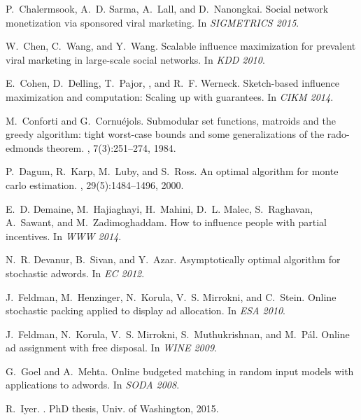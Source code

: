 \begin{thebibliography}{10}
\begin{scriptsize}
P.~Chalermsook, A.~D. Sarma, A.~Lall, and D.~Nanongkai.
\newblock Social network monetization via sponsored viral marketing.
\newblock In {\em SIGMETRICS 2015}.

W.~Chen, C.~Wang, and Y.~Wang.
\newblock Scalable influence maximization for prevalent viral marketing in
  large-scale social networks.
\newblock In {\em KDD 2010}.

E.~Cohen, D.~Delling, T.~Pajor, , and R.~F. Werneck.
\newblock Sketch-based influence maximization and computation: Scaling up with
  guarantees.
\newblock In {\em CIKM 2014}.

M.~Conforti and G.~Cornu{\'e}jols.
\newblock Submodular set functions, matroids and the greedy algorithm: tight
  worst-case bounds and some generalizations of the rado-edmonds theorem.
, 7(3):251--274, 1984.

P.~Dagum, R.~Karp, M.~Luby, and S.~Ross.
\newblock An optimal algorithm for monte carlo estimation.
, 29(5):1484--1496, 2000.

E.~D. Demaine, M.~Hajiaghayi, H.~Mahini, D.~L. Malec, S.~Raghavan, A.~Sawant,
  and M.~Zadimoghaddam.
\newblock How to influence people with partial incentives.
\newblock In {\em {WWW} 2014}.

N.~R. Devanur, B.~Sivan, and Y.~Azar.
\newblock Asymptotically optimal algorithm for stochastic adwords.
\newblock In {\em EC 2012}.

J.~Feldman, M.~Henzinger, N.~Korula, V.~S. Mirrokni, and C.~Stein.
\newblock Online stochastic packing applied to display ad allocation.
\newblock In {\em ESA 2010}.

J.~Feldman, N.~Korula, V.~S. Mirrokni, S.~Muthukrishnan, and M.~P{\'{a}}l.
\newblock Online ad assignment with free disposal.
\newblock In {\em WINE 2009}.

G.~Goel and A.~Mehta.
\newblock Online budgeted matching in random input models with applications to
  adwords.
\newblock In {\em SODA 2008}.

R.~Iyer.
.
\newblock PhD thesis, Univ. of Washington, 2015.


\end{scriptsize}
\end{thebibliography}
